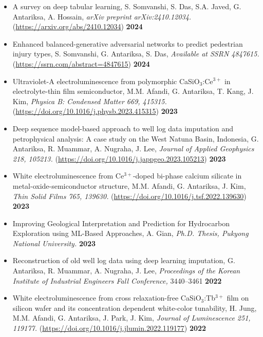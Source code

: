 \documentclass[10pt,a4paper]{article}
\begin{document}
\begin{itemize}
    \item A survey on deep tabular learning, S. Somvanshi, S. Das, S.A. Javed, G. Antariksa, A. Hossain, \textit{arXiv preprint arXiv:2410.12034.} (\href{https://arxiv.org/abs/2410.12034}{https://arxiv.org/abs/2410.12034}) \textbf{2024}

    \item Enhanced balanced-generative adversarial networks to predict pedestrian injury types, S. Somvanshi, G. Antariksa, S. Das, \textit{Available at SSRN 4847615.} (\href{https://ssrn.com/abstract=4847615}{https://ssrn.com/abstract=4847615}) \textbf{2024}

    \item Ultraviolet-A electroluminescence from polymorphic CaSiO$_3$:Ce$^{3+}$ in electrolyte-thin film semiconductor, M.M. Afandi, G. Antariksa, T. Kang, J. Kim, \textit{Physica B: Condensed Matter 669, 415315.} (\href{https://doi.org/10.1016/j.physb.2023.415315}{https://doi.org/10.1016/j.physb.2023.415315}) \textbf{2023}

    \item Deep sequence model-based approach to well log data imputation and petrophysical analysis: A case study on the West Natuna Basin, Indonesia, G. Antariksa, R. Muammar, A. Nugraha, J. Lee, \textit{Journal of Applied Geophysics 218, 105213.} (\href{https://doi.org/10.1016/j.jappgeo.2023.105213}{https://doi.org/10.1016/j.jappgeo.2023.105213}) \textbf{2023}

    \item White electroluminescence from Ce$^{3+}$-doped bi-phase calcium silicate in metal-oxide-semiconductor structure, M.M. Afandi, G. Antariksa, J. Kim, \textit{Thin Solid Films 765, 139630.} (\href{https://doi.org/10.1016/j.tsf.2022.139630}{https://doi.org/10.1016/j.tsf.2022.139630}) \textbf{2023}

    \item Improving Geological Interpretation and Prediction for Hydrocarbon Exploration using ML-Based Approaches, A. Gian, \textit{Ph.D. Thesis, Pukyong National University.} \textbf{2023}

    \item Reconstruction of old well log data using deep learning imputation, G. Antariksa, R. Muammar, A. Nugraha, J. Lee, \textit{Proceedings of the Korean Institute of Industrial Engineers Fall Conference,} 3440--3461 \textbf{2022}

    \item White electroluminescence from cross relaxation-free CaSiO$_3$:Tb$^{3+}$ film on silicon wafer and its concentration dependent white-color tunability, H. Jung, M.M. Afandi, G. Antariksa, J. Park, J. Kim, \textit{Journal of Luminescence 251, 119177.} (\href{https://doi.org/10.1016/j.jlumin.2022.119177}{https://doi.org/10.1016/j.jlumin.2022.119177}) \textbf{2022}


\end{itemize}
\end{document}
